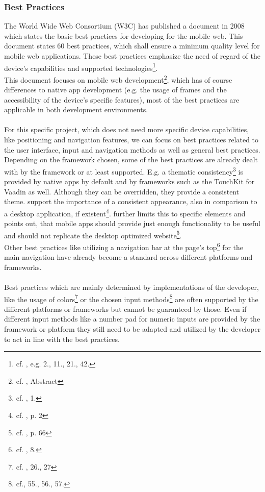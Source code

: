 \subsubsection{Best Practices}
The World Wide Web Consortium (W3C) has published a document in 2008 which states the basic best practices for developing for the mobile web. This document states 60 best practices, which shall ensure a minimum quality level for mobile web applications. These best practices emphasize the need of regard of the device's capabilities and supported technologies\footnote{cf. \cite{WorldWideWebConsortium.2008}, e.g. 2., 11., 21., 42.}. 
\\
This document focuses on mobile web development\footnote{cf. \cite{WorldWideWebConsortium.2008}, Abstract}, which has of course differences to native app development (e.g. the usage of frames and the accessibility of the device's specific features), most of the best practices are applicable in both development environments.
\\
\\
For this specific project, which does not need more specific device capabilities, like positioning and navigation features, we can focus on best practices related to the user interface, input and navigation methods as well as general best practices. Depending on the framework chosen, some of the best practices are already dealt with by the framework or at least supported. E.g. a thematic consistency\footnote{cf. \cite{WorldWideWebConsortium.2008}, 1.} is provided by native apps by default and by frameworks such as the TouchKit for Vaadin as well. Although they can be overridden, they provide a consistent theme. \cite{Wessels.2011} support the importance of a consistent appearance, also in comparison to a desktop application, if existent\footnote{cf. \cite{Wessels.2011}, p. 2}. \cite{Lica.2010} further limits this to specific elements and points out, that mobile apps should provide just enough functionality to be useful and should not replicate the desktop optimized website\footnote{cf. \cite{Lica.2010}, p. 66}.
\\
Other best practices like utilizing a navigation bar at the page's top\footnote{cf. \cite{WorldWideWebConsortium.2008}, 8.} for the main navigation have already become a standard across different platforms and frameworks.
\\
\\
Best practices which are mainly determined by implementations of the developer, like the usage of colors\footnote{cf. \cite{WorldWideWebConsortium.2008}, 26., 27} or the chosen input methods\footnote{cf.\cite{WorldWideWebConsortium.2008}, 55., 56., 57.} are often supported by the different platforms or frameworks but cannot be guaranteed by those. Even if different input methods like a number pad for numeric inputs are provided by the framework or platform they still need to be adapted and utilized by the developer to act in line with the best practices.
